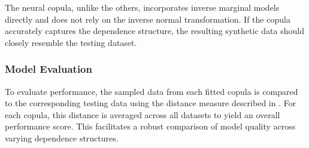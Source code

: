 The neural copula, unlike the others, incorporates inverse marginal models directly and does not rely on the inverse normal transformation. If the copula accurately captures the dependence structure, the resulting synthetic data should closely resemble the testing dataset.

\subsubsection{Model Evaluation}
To evaluate performance, the sampled data from each fitted copula is compared to the corresponding testing data using the distance measure described in . For each copula, this distance is averaged across all datasets to yield an overall performance score. This facilitates a robust comparison of model quality across varying dependence structures.
































